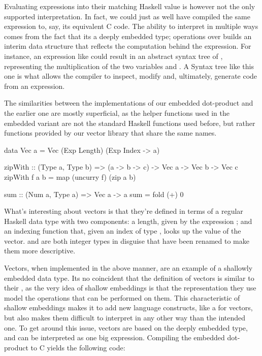 Evaluating expressions into their matching Haskell value is however not the only supported interpretation. In fact, we could just as well have compiled the same expression to, say, its equivalent C code. The ability to interpret  in multiple ways comes from the fact that its a deeply embedded type; operations over  builds an interim data structure that reflects the computation behind the expression. For instance, an expression like  could result in an abstract syntax tree of , representing the multiplication of the two variables  and . A Syntax tree like this one is what allows the compiler to inspect, modify and, ultimately, generate code from an expression.

The similarities between the implementations of our embedded dot-product and the earlier one are mostly superficial, as the helper functions used in the embedded variant are not the standard Haskell functions used before, but rather functions provided by our vector library that share the same names.

\begin{code}
data Vec a = Vec (Exp Length) (Exp Index -> a)

zipWith :: (Type a, Type b) => (a -> b -> c) -> Vec a -> Vec b -> Vec c
zipWith f a b = map (uncurry f) (zip a b)

sum :: (Num a, Type a) => Vec a -> a
sum = fold (+) 0
\end{code}

\noindent What's interesting about vectors is that they're defined in terms of a regular Haskell data type with two components: a length, given by the expression ; and an indexing function  that, given an index of type , looks up the value  of the vector.  and  are both integer types in disguise that have been renamed to make them more descriptive.

Vectors, when implemented in the above manner, are an example of a shallowly embedded data type. Its no coincident that the definition of vectors is similar to their , as the very idea of shallow embeddings is that the representation they use model the operations that can be performed on them. This characteristic of shallow embeddings makes it  to add new language constructs, like a  for vectors, but also makes them difficult to interpret in any other way than the intended one. To get around this issue, vectors are based on the deeply embedded  type, and can be interpreted as one big expression. Compiling the embedded dot-product to C yields the following code:


